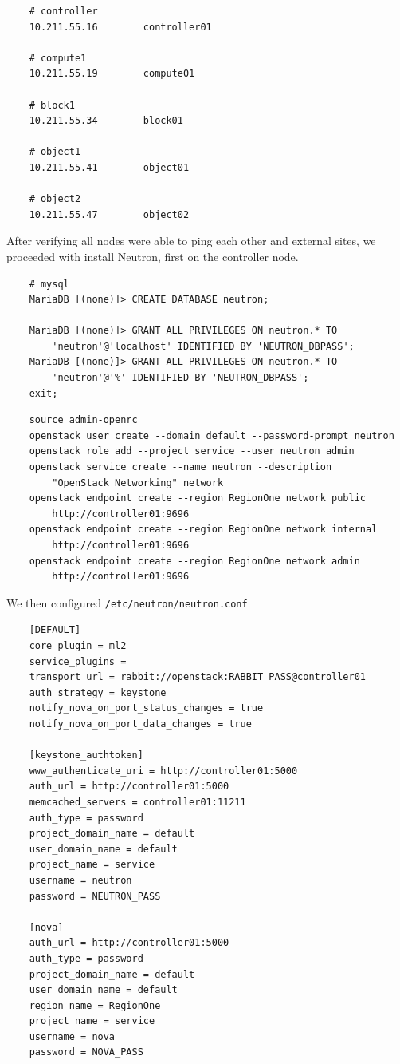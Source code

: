 \documentclass{article}
\begin{document}
\begin{verbatim}
    # controller
    10.211.55.16        controller01

    # compute1
    10.211.55.19        compute01

    # block1
    10.211.55.34        block01

    # object1
    10.211.55.41        object01

    # object2
    10.211.55.47        object02
\end{verbatim}

After verifying all nodes were able to ping each other and external sites, we proceeded with install Neutron, first on the controller node.

\begin{verbatim}
    # mysql
    MariaDB [(none)]> CREATE DATABASE neutron;

    MariaDB [(none)]> GRANT ALL PRIVILEGES ON neutron.* TO
        'neutron'@'localhost' IDENTIFIED BY 'NEUTRON_DBPASS';
    MariaDB [(none)]> GRANT ALL PRIVILEGES ON neutron.* TO
        'neutron'@'%' IDENTIFIED BY 'NEUTRON_DBPASS';
    exit;
\end{verbatim}

\begin{verbatim}
    source admin-openrc
    openstack user create --domain default --password-prompt neutron
    openstack role add --project service --user neutron admin
    openstack service create --name neutron --description 
        "OpenStack Networking" network
    openstack endpoint create --region RegionOne network public 
        http://controller01:9696
    openstack endpoint create --region RegionOne network internal 
        http://controller01:9696
    openstack endpoint create --region RegionOne network admin 
        http://controller01:9696
\end{verbatim}

We then configured \texttt{/etc/neutron/neutron.conf}

\begin{verbatim}
    [DEFAULT]
    core_plugin = ml2
    service_plugins =
    transport_url = rabbit://openstack:RABBIT_PASS@controller01
    auth_strategy = keystone
    notify_nova_on_port_status_changes = true
    notify_nova_on_port_data_changes = true

    [keystone_authtoken]
    www_authenticate_uri = http://controller01:5000
    auth_url = http://controller01:5000
    memcached_servers = controller01:11211
    auth_type = password
    project_domain_name = default
    user_domain_name = default
    project_name = service
    username = neutron
    password = NEUTRON_PASS

    [nova]
    auth_url = http://controller01:5000
    auth_type = password
    project_domain_name = default
    user_domain_name = default
    region_name = RegionOne
    project_name = service
    username = nova
    password = NOVA_PASS
\end{verbatim}
\end{document}
